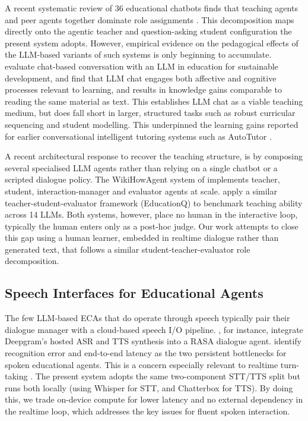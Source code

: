 A recent systematic review of 36 educational chatbots finds that
teaching agents and peer agents together dominate role assignments
\citep{kuhail2023interacting}. This decomposition maps directly
onto the agentic teacher and question-asking student configuration the
present system adopts. However, empirical evidence on the pedagogical effects
of the LLM-based variants of such systems is only
beginning to accumulate. \citet{SpangenbergerPia2026CwaL}
evaluate chat-based conversation with an LLM in education for
sustainable development, and find that LLM chat engages both
affective and cognitive processes relevant to
learning, and results in knowledge gains comparable to reading the same
material as text. This establishes LLM chat as a viable teaching
medium, but does fall short in larger, structured tasks such as robust curricular sequencing and student modelling. 
This underpinned the learning gains reported for earlier conversational intelligent tutoring systems such as AutoTutor \citep{graesser2016autotutor}.

A recent architectural response to recover the teaching
structure, is by composing several specialised LLM agents rather than
relying on a single chatbot or a scripted dialogue policy. The
WikiHowAgent system of \citet{pei-etal-2025conversational}
implements teacher, student, interaction-manager and evaluator
agents at scale. \citet{shi-etal-2025-educationq} apply a similar teacher-student-evaluator 
framework (EducationQ) to benchmark teaching ability across 14 LLMs. Both systems, however, place no
human in the interactive loop, typically the human enters only as a
post-hoc judge. Our work attempts to close this gap using a human learner, 
embedded in realtime dialogue rather than generated text, that follows a similar student-teacher-evaluator role decomposition. 


\subsection{Speech Interfaces for Educational Agents}
\label{sec:speech_interfaces}

The few LLM-based ECAs that do operate through speech
typically pair their dialogue manager with a cloud-based speech I/O pipeline.
\citet{fictive_dialogs}, for instance, integrate Deepgram's hosted
ASR and TTS synthesis into a RASA dialogue agent.
\citet{Sydorenko2025} identify recognition error and end-to-end
latency as the two persistent bottlenecks for spoken educational
agents. This is a concern especially relevant to realtime turn-taking
\citep{skantze2021turntaking}. The present system adopts the same
two-component STT/TTS split but runs both locally (using Whisper for STT,
and Chatterbox for TTS). By doing this, we trade on-device compute for lower latency
and no external dependency in the realtime loop, which addresses the key issues \citep{Sydorenko2025} for fluent spoken interaction.

